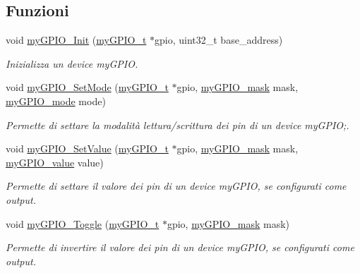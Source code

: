 \subsection*{Funzioni}
\begin{DoxyCompactItemize}
\item 
void \hyperlink{group__bare-metal_ga588201358d1633c53535b288c9198531}{my\+G\+P\+I\+O\+\_\+\+Init} (\hyperlink{structmy_g_p_i_o__t}{my\+G\+P\+I\+O\+\_\+t} $\ast$gpio, uint32\+\_\+t base\+\_\+address)
\begin{DoxyCompactList}\small\item\em Inizializza un device my\+G\+P\+I\+O. \end{DoxyCompactList}\item 
void \hyperlink{group__bare-metal_ga43e82eb0febd452635a438fbd9cb853b}{my\+G\+P\+I\+O\+\_\+\+Set\+Mode} (\hyperlink{structmy_g_p_i_o__t}{my\+G\+P\+I\+O\+\_\+t} $\ast$gpio, \hyperlink{group__bare-metal_ga402a0d20afc0cb7c25554b8b023f4253}{my\+G\+P\+I\+O\+\_\+mask} mask, \hyperlink{group__bare-metal_ga76b849f0e0c05e7f9161bdb33396f2b1}{my\+G\+P\+I\+O\+\_\+mode} mode)
\begin{DoxyCompactList}\small\item\em Permette di settare la modalità lettura/scrittura dei pin di un device my\+G\+P\+I\+O;. \end{DoxyCompactList}\item 
void \hyperlink{group__bare-metal_ga9d9ce9d2db7d77a588da4a3749f2f24d}{my\+G\+P\+I\+O\+\_\+\+Set\+Value} (\hyperlink{structmy_g_p_i_o__t}{my\+G\+P\+I\+O\+\_\+t} $\ast$gpio, \hyperlink{group__bare-metal_ga402a0d20afc0cb7c25554b8b023f4253}{my\+G\+P\+I\+O\+\_\+mask} mask, \hyperlink{group__bare-metal_gaf634fe4a0e1eab8da5000b72d6ad362b}{my\+G\+P\+I\+O\+\_\+value} value)
\begin{DoxyCompactList}\small\item\em Permette di settare il valore dei pin di un device my\+G\+P\+I\+O, se configurati come output. \end{DoxyCompactList}\item 
void \hyperlink{group__bare-metal_ga449b2af7cc20d24e6f6e017cf792ce03}{my\+G\+P\+I\+O\+\_\+\+Toggle} (\hyperlink{structmy_g_p_i_o__t}{my\+G\+P\+I\+O\+\_\+t} $\ast$gpio, \hyperlink{group__bare-metal_ga402a0d20afc0cb7c25554b8b023f4253}{my\+G\+P\+I\+O\+\_\+mask} mask)
\begin{DoxyCompactList}\small\item\em Permette di invertire il valore dei pin di un device my\+G\+P\+I\+O, se configurati come output. \end{DoxyCompactList}\item 

\end{DoxyCompactItemize}
